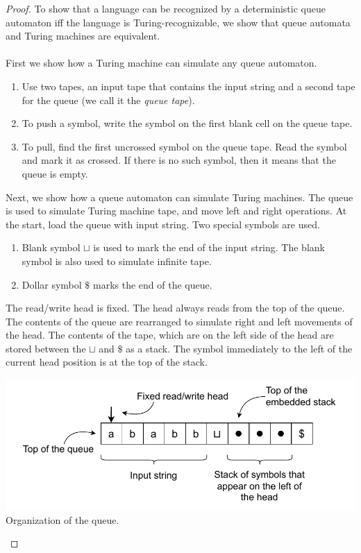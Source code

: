 \documentclass[11pt]{article}
\begin{document}
\begin{proof}
To show that a language can be recognized by a deterministic queue automaton iff the language is Turing-recognizable, we show that queue automata and Turing machines are equivalent. \\
\\
First we show how a Turing machine can simulate any queue automaton.
\begin{enumerate}
\item Use two tapes, an input tape that contains the input string and a second tape for the queue (we call it the \textit{queue tape}).
\item To push a symbol, write the symbol on the first blank cell on the queue tape.
\item To pull, find the first uncrossed symbol on the queue tape. Read the symbol and mark it as crossed. If there is no such symbol, then it means that the queue is empty.
\end{enumerate}
Next, we show how a queue automaton can simulate Turing machines. The queue is used to simulate Turing machine tape, and move left and right operations.  At the start, load the queue with input string. Two special symbols are used.
\begin{enumerate}
\item Blank symbol $\sqcup$ is used to mark the end of the input string. The blank symbol is also used to simulate infinite tape.
\item Dollar symbol $\$$ marks the end of the queue.
\end{enumerate}

The read/write head is fixed. The head always reads from the top of the queue. The contents of the queue are rearranged to simulate right and left movements of the head. The contents of the tape, which are on the left side of the head are stored between the $\sqcup$ and $\$$ as a stack. The symbol immediately to the left of the current head position is at the top of the stack.

\begin{center}
\includegraphics[scale=0.85]{Figures/Problem3.14a.pdf} \\
Organization of the queue.
\end{center}


\end{proof}
\end{document}
